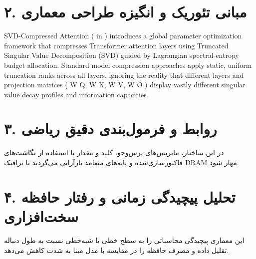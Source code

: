 \documentclass[12pt,a4paper]{article}
\begin{document}
\section*{۲. مبانی تئوریک و انگیزه طراحی معماری}
SVD-Compressed Attention ( in ) introduces a global parameter optimization framework that compresses Transformer attention layers using Truncated Singular Value Decomposition (SVD) guided by Lagrangian spectral-entropy budget allocation. Standard model compression approaches apply static, uniform truncation ranks across all layers, ignoring the reality that different layers and projection matrices ( W Q, W K, W V, W O ) display vastly different singular value decay profiles and information capacities.

\section*{۳. روابط و فرمول‌بندی دقیق ریاضی}
در این ساختار، ماتریس‌های پرس‌وجو، کلید و مقدار با استفاده از نگاشت‌های فاکتورسازی‌شده و پایه‌های متعامد بازآرایی می‌گردند تا ترافیک DRAM مهار شود.

\section*{۴. تحلیل پیچیدگی زمانی و رفتار حافظه سخت‌افزاری}
این معماری پیچیدگی محاسباتی را به سطح خطی یا شبه‌خطی نسبت به طول دنباله تقلیل داده و مصرف حافظه را در مقایسه با مدل مبنا به شدت کاهش می‌دهد.
\end{document}
